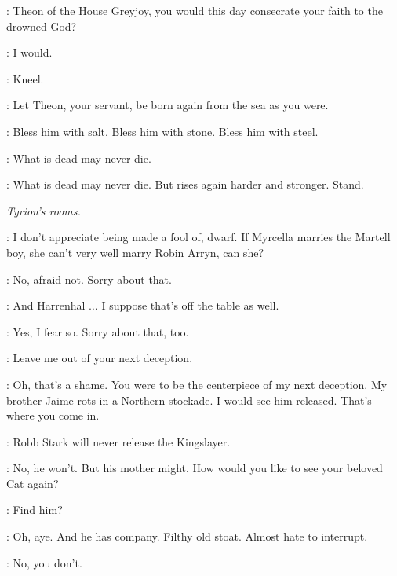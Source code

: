 

\DROWNEDPRIEST: Theon of the House Greyjoy, you would this day consecrate your faith to the drowned God? 

\THEON: I would. 

\DROWNEDPRIEST: Kneel. 


\DROWNEDPRIEST: Let Theon, your servant, be born again from the sea as you were. 


\DROWNEDPRIEST: Bless him with salt. Bless him with stone. Bless him with steel. 

\THEON: What is dead may never die. 

\DROWNEDPRIEST: What is dead may never die. But rises again harder and stronger. Stand. 


\scene

\textit{Tyrion's rooms.} 

\LITTLEFINGER: I don't appreciate being made a fool of, dwarf. If Myrcella marries the Martell boy, she can't very well marry Robin Arryn, can she? 

\TYRION: No, afraid not. Sorry about that. 

\LITTLEFINGER: And Harrenhal $\ldots$ I suppose that's off the table as well. 

\TYRION: Yes, I fear so. Sorry about that, too. 

\LITTLEFINGER: Leave me out of your next deception. 

\TYRION: Oh, that's a shame. You were to be the centerpiece of my next deception. My brother Jaime rots in a Northern stockade. I would see him released. That's where you come in. 

\LITTLEFINGER: Robb Stark will never release the Kingslayer. 

\TYRION: No, he won't. But his mother might. How would you like to see your beloved Cat again? 


\TYRION: Find him? 

\BRONN: Oh, aye. And he has company. Filthy old stoat. Almost hate to interrupt. 

\TYRION: No, you don't. 

